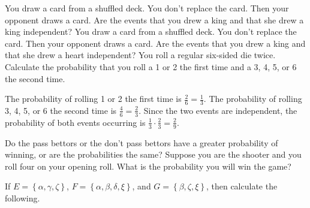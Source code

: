 \documentclass[12pt]{exam}
\begin{document}
\begin{questions}
\question You draw a card from a shuffled deck. You don't replace
the card. Then your opponent draws a card. Are the events that
you drew a king and that she drew a king independent?
\question You draw a card from a shuffled deck. You don't replace
the card. Then your opponent draws a card. Are the events that
you drew a king and that she drew a heart independent?
\question You roll a regular six-sided die twice. Calculate
the probability that you roll a 1 or 2 the first time and a
3, 4, 5, or 6 the second time.
\begin{solution} The probability of rolling 1 or 2 the first
time is $\frac{2}{6}=\frac{1}{3}$.
The probability of rolling 3, 4, 5, or 6 the second time
is $\frac{4}{6}=\frac{2}{3}$.
Since the two events are independent, the probability of both
events occurring is $\frac{1}{3}\cdot\frac{2}{3}=\frac{2}{9}$. \end{solution}

\question Do the pass bettors or the don't pass bettors have
a greater probability of winning, or are the probabilities the same?
\question Suppose you are the shooter and you roll four on your opening
roll. What is the probability you will win the game?

\question If $E=\left\{\alpha,\gamma,\zeta\right\}$,
$F=\left\{\alpha,\beta,\delta,\xi\right\}$, and
$G=\left\{\beta,\zeta,\xi\right\}$, then calculate the following.
\end{questions}
\end{document}
